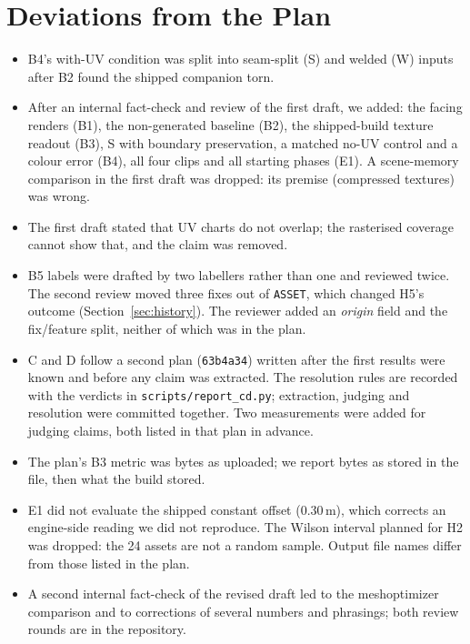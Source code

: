 \section{Deviations from the Plan}
\label{sec:deviations}
\begin{itemize}
\item B4's with-UV condition was split into seam-split (S) and welded (W) inputs
  after B2 found the shipped companion torn.
\item After an internal fact-check and review of the first draft, we added: the
  facing renders (B1), the non-generated baseline (B2), the shipped-build texture
  readout (B3), S with boundary preservation, a matched no-UV control and a colour
  error (B4), all four clips and all starting phases (E1). A scene-memory
  comparison in the first draft was dropped: its premise (compressed textures) was
  wrong.
\item The first draft stated that UV charts do not overlap; the rasterised
  coverage cannot show that, and the claim was removed.
\item B5 labels were drafted by two labellers rather than one and reviewed twice.
  The second review moved three fixes out of \texttt{ASSET}, which changed H5's
  outcome (Section~\ref{sec:history}). The reviewer added an \emph{origin} field
  and the fix/feature split, neither of which was in the plan.
\item C and D follow a second plan (\texttt{63b4a34}) written after the first
  results were known and before any claim was extracted. The resolution rules are
  recorded with the verdicts in \texttt{scripts/report\_cd.py}; extraction, judging
  and resolution were committed together. Two measurements were added for judging
  claims, both listed in that plan in advance.
\item The plan's B3 metric was bytes as uploaded; we report bytes as stored in the
  file, then what the build stored.
\item E1 did not evaluate the shipped constant offset (0.30\,m), which corrects an
  engine-side reading we did not reproduce. The Wilson interval planned for H2
  was dropped: the 24 assets are not a random sample. Output file names differ
  from those listed in the plan.
\item A second internal fact-check of the revised draft led to the meshoptimizer
  comparison and to corrections of several numbers and phrasings; both review
  rounds are in the repository.
\end{itemize}
